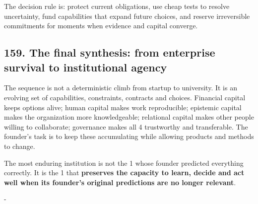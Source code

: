 The decision rule is: protect current obligations, use cheap tests to resolve uncertainty, fund capabilities that expand future choices, and reserve irreversible commitments for moments when evidence and capital converge.

\subsection{159. The final synthesis: from enterprise survival to institutional agency}

The sequence is not a deterministic climb from startup to university. It is an evolving set of capabilities, constraints, contracts and choices. Financial capital keeps options alive; human capital makes work reproducible; epistemic capital makes the organization more knowledgeable; relational capital makes other people willing to collaborate; governance makes all 4 trustworthy and transferable. The founder's task is to keep these accumulating while allowing products and methods to change.

The most enduring institution is not the 1 whose founder predicted everything correctly. It is the 1 that \textbf{preserves the capacity to learn, decide and act well when its founder's original predictions are no longer relevant}.

-


